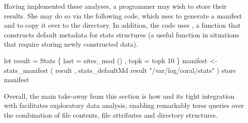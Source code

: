 Having implemented these analyses, a programmer may wish to store their
results.  She may do so via the following code, which
uses  to generate a manifest and 
to copy it over to the  directory.  In addition,
the code uses , a function
that constructs default metadata for stats structures
(a useful function in situations that require storing newly
constructed data).


\begin{code}
let result = Stats \{ last = sites_mod ()
                   , topk = topk 10 \}
manifest <- stats_manifest 
  ( result
  , stats_defaultMd result "/var/log/coral/stats" )
store manifest 
\end{code}



Overall, the main take-away from this section is how 
\forest{} and its tight integration with
\haskell{} facilitates exploratory data analysis,
enabling remarkably terse queries over the combination of file
contents, file attributes and directory structures.

